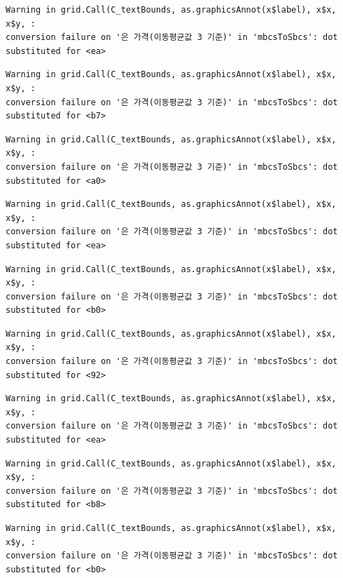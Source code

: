 \documentclass[
  letterpaper,
  DIV=11,
  numbers=noendperiod]{scrreprt}
\begin{document}
\begin{verbatim}
Warning in grid.Call(C_textBounds, as.graphicsAnnot(x$label), x$x, x$y, :
conversion failure on '은 가격(이동평균값 3 기준)' in 'mbcsToSbcs': dot
substituted for <ea>
\end{verbatim}

\begin{verbatim}
Warning in grid.Call(C_textBounds, as.graphicsAnnot(x$label), x$x, x$y, :
conversion failure on '은 가격(이동평균값 3 기준)' in 'mbcsToSbcs': dot
substituted for <b7>
\end{verbatim}

\begin{verbatim}
Warning in grid.Call(C_textBounds, as.graphicsAnnot(x$label), x$x, x$y, :
conversion failure on '은 가격(이동평균값 3 기준)' in 'mbcsToSbcs': dot
substituted for <a0>
\end{verbatim}

\begin{verbatim}
Warning in grid.Call(C_textBounds, as.graphicsAnnot(x$label), x$x, x$y, :
conversion failure on '은 가격(이동평균값 3 기준)' in 'mbcsToSbcs': dot
substituted for <ea>
\end{verbatim}

\begin{verbatim}
Warning in grid.Call(C_textBounds, as.graphicsAnnot(x$label), x$x, x$y, :
conversion failure on '은 가격(이동평균값 3 기준)' in 'mbcsToSbcs': dot
substituted for <b0>
\end{verbatim}

\begin{verbatim}
Warning in grid.Call(C_textBounds, as.graphicsAnnot(x$label), x$x, x$y, :
conversion failure on '은 가격(이동평균값 3 기준)' in 'mbcsToSbcs': dot
substituted for <92>
\end{verbatim}

\begin{verbatim}
Warning in grid.Call(C_textBounds, as.graphicsAnnot(x$label), x$x, x$y, :
conversion failure on '은 가격(이동평균값 3 기준)' in 'mbcsToSbcs': dot
substituted for <ea>
\end{verbatim}

\begin{verbatim}
Warning in grid.Call(C_textBounds, as.graphicsAnnot(x$label), x$x, x$y, :
conversion failure on '은 가격(이동평균값 3 기준)' in 'mbcsToSbcs': dot
substituted for <b8>
\end{verbatim}

\begin{verbatim}
Warning in grid.Call(C_textBounds, as.graphicsAnnot(x$label), x$x, x$y, :
conversion failure on '은 가격(이동평균값 3 기준)' in 'mbcsToSbcs': dot
substituted for <b0>
\end{verbatim}
\end{document}
